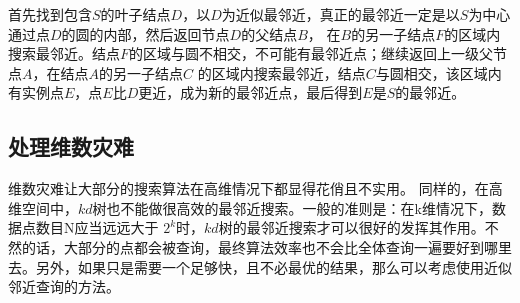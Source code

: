 首先找到包含$S$的叶子结点$D$，以$D$为近似最邻近，真正的最邻近一定是以$S$为中心通过点$D$的圆的内部，然后返回节点$D$的父结点$B$，
在$B$的另一子结点$F$的区域内搜索最邻近。结点$F$的区域与圆不相交，不可能有最邻近点；继续返回上一级父节点$A$，在结点$A$的另一子结点$C$
的区域内搜索最邻近，结点$C$与圆相交，该区域内有实例点$E$，点$E$比$D$更近，成为新的最邻近点，最后得到$E$是$S$的最邻近。

\subsection*{处理维数灾难}

维数灾难让大部分的搜索算法在高维情况下都显得花俏且不实用。 同样的，在高维空间中，$kd$树也不能做很高效的最邻近搜索。一般的准则是：在k维情况下，数据点数目N应当远远大于
$2^k$时，$kd$树的最邻近搜索才可以很好的发挥其作用。不然的话，大部分的点都会被查询，最终算法效率也不会比全体查询一遍要好到哪里去。另外，如果只是需要一个足够快，且不必最优的结果，那么可以考虑使用近似邻近查询的方法。